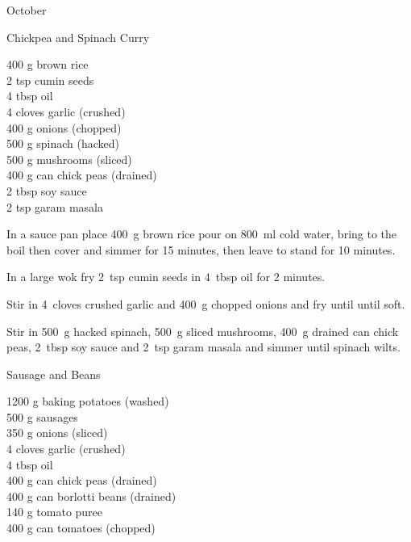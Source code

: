\begin{menu}{October}
    \begin{recipe}{2}{Chickpea and Spinach Curry}%
		\begin{ingredients}
		400 g brown rice  \\
	2 tsp cumin seeds  \\
	4 tbsp oil  \\
	4 cloves garlic (crushed) \\
	400 g onions (chopped) \\
	500 g spinach (hacked) \\
	500 g mushrooms (sliced) \\
	400 g can chick peas (drained) \\
	2 tbsp soy sauce  \\
	2 tsp garam masala  \\
	
		\end{ingredients}
	
	
    \begin{instructions}
    \item 
      In a
      sauce pan
      place
      400~g  brown rice
      pour on
      800~ml  cold water,
      bring to the boil then cover and simmer for 15 minutes,
      then leave to stand for 10 minutes.
    \item 
        In a large wok fry
        2~tsp  cumin seeds
        in
        4~tbsp  oil
        for 2 minutes.
      \item 
        Stir in
        4~cloves crushed garlic
        and
        400~g chopped onions
        and fry until until soft.
      \item 
        Stir in
        500~g hacked spinach,
        500~g sliced mushrooms,
        400~g drained can chick peas,
        2~tbsp  soy sauce
        and
        2~tsp  garam masala
        and simmer until spinach wilts.
      
    \end{instructions}
    \end{recipe}%
  
    \begin{recipe}{2}{Sausage and Beans}%
		\begin{ingredients}
		1200 g baking potatoes (washed) \\
	500 g sausages  \\
	350 g onions (sliced) \\
	4 cloves garlic (crushed) \\
	4 tbsp oil  \\
	400 g can chick peas (drained) \\
	400 g can borlotti beans (drained) \\
	140 g tomato puree  \\
	400 g can tomatoes (chopped) \\
	

\end{ingredients}
\end{recipe}
\end{menu}
